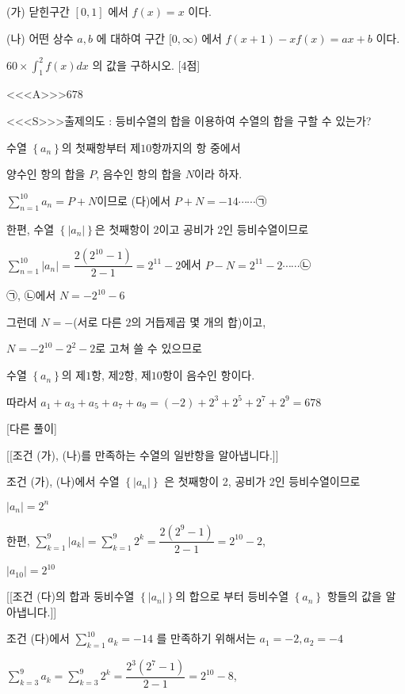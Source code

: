 \documentclass{oblivoir}
\begin{document}
(가) 닫힌구간 $[0,1]$ 에서 $f(x)=x$ 이다.

(나) 어떤 상수 $a, b$ 에 대하여 구간 $[0, \infty)$ 에서 $f(x+1)-x f(x)=a x+b$ 이다.

$60 \times \displaystyle\int_{1}^{2} f(x) d x$ 의 값을 구하시오. [4점]


<<<A>>>$678$

<<<S>>>출제의도 : 등비수열의 합을 이용하여 수열의 합을 구할 수 있는가?

수열 $\left\{a_{n}\right\}$의 첫째항부터 제$10$항까지의 항 중에서

양수인 항의 합을 $P$, 음수인 항의 합을 $N$이라 하자.

$\sum_{n=1}^{10}a_{n}=P+N$이므로 (다)에서 $P+N=-14\cdots\cdots$㉠

한편, 수열 $\left\{\left | a_{n}\right |\right\}$은 첫째항이 $2$이고 공비가 $2$인 등비수열이므로

$\sum_{n=1}^{10}\left | a_{n}\right | =\dfrac{2(2^{10}-1)}{2-1}=2^{11}-2$에서 $P-N=2^{11}-2\cdots\cdots$㉡

㉠, ㉡에서 $N=-2^{10}-6$

그런데 $N=-$(서로 다른 $2$의 거듭제곱 몇 개의 합)이고, 

$N=-2^{10}-2^{2}-2$로 고쳐 쓸 수 있으므로

수열 $\left\{a_{n}\right\}$의 제$1$항, 제$2$항, 제$10$항이 음수인 항이다.

따라서 $a_{1}+a_{3}+a_{5}+a_{7}+a_{9}=(-2)+2^{3}+2^{5}+2^{7}+2^{9}=678$

[다른 풀이]

[[조건 (가), (나)를 만족하는 수열의 일반항을 알아냅니다.]]

조건 (가), (나)에서 수열 $\left\{\left|a_{n}\right|\right\}$ 은 첫째항이 2, 공비가 2인 등비수열이므로

$\left|a_{n}\right|=2^{n}$

한편,
$\displaystyle\sum_{k=1}^{9}\left|a_{k}\right|=\displaystyle\sum_{k=1}^{9} 2^{k}=\dfrac{2\left(2^{9}-1\right)}{2-1}=2^{10}-2$,

$\left|a_{10}\right|=2^{10}$

[[조건 (다)의 합과 둥비수열 $\left\{\left|a_{n}\right|\right\}$의 합으로 부터 등비수열  $\left\{a_{n}\right\}$ 항들의 값을 알아냅니다.]]

조건 (다)에서 $\displaystyle\sum_{k=1}^{10} a_{k}=-14$ 를 만족하기 위해서는
$a_{1}=-2, a_{2}=-4$

$\displaystyle\sum_{k=3}^{9} a_{k}=\displaystyle\sum_{k=3}^{9} 2^{k}=\dfrac{2^{3}\left(2^{7}-1\right)}{2-1}=2^{10}-8$,
\end{document}
